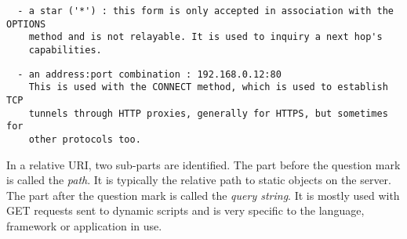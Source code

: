 \begin{verbatim}
  - a star ('*') : this form is only accepted in association with the OPTIONS
    method and is not relayable. It is used to inquiry a next hop's
    capabilities.
\end{verbatim}

\begin{verbatim}
  - an address:port combination : 192.168.0.12:80
    This is used with the CONNECT method, which is used to establish TCP
    tunnels through HTTP proxies, generally for HTTPS, but sometimes for
    other protocols too.
\end{verbatim}


In a relative URI, two sub-parts are identified. The part before the question
mark is called the \emph{path}. It is typically the relative path to static objects
on the server. The part after the question mark is called the \emph{query string}.
It is mostly used with GET requests sent to dynamic scripts and is very
specific to the language, framework or application in use.

